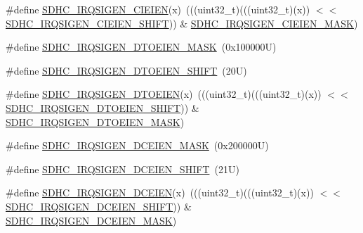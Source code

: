 \begin{DoxyCompactItemize}
\item 
\#define \mbox{\hyperlink{group___s_d_h_c___register___masks_ga99a71a7e4975a9a288ec66d6df527bb8}{S\+D\+H\+C\+\_\+\+I\+R\+Q\+S\+I\+G\+E\+N\+\_\+\+C\+I\+E\+I\+EN}}(x)~(((uint32\+\_\+t)(((uint32\+\_\+t)(x)) $<$$<$ \mbox{\hyperlink{group___s_d_h_c___register___masks_gae0d92453706b49294eac23eb53e2c742}{S\+D\+H\+C\+\_\+\+I\+R\+Q\+S\+I\+G\+E\+N\+\_\+\+C\+I\+E\+I\+E\+N\+\_\+\+S\+H\+I\+FT}})) \& \mbox{\hyperlink{group___s_d_h_c___register___masks_ga3a09f7cd7b41c260dd89ea77a1511005}{S\+D\+H\+C\+\_\+\+I\+R\+Q\+S\+I\+G\+E\+N\+\_\+\+C\+I\+E\+I\+E\+N\+\_\+\+M\+A\+SK}})
\item 
\#define \mbox{\hyperlink{group___s_d_h_c___register___masks_ga16c82f46bb0de77ecd32731d597843e4}{S\+D\+H\+C\+\_\+\+I\+R\+Q\+S\+I\+G\+E\+N\+\_\+\+D\+T\+O\+E\+I\+E\+N\+\_\+\+M\+A\+SK}}~(0x100000\+U)
\item 
\#define \mbox{\hyperlink{group___s_d_h_c___register___masks_ga0d5615f1a4d2d1e8f8897fefbf7c1366}{S\+D\+H\+C\+\_\+\+I\+R\+Q\+S\+I\+G\+E\+N\+\_\+\+D\+T\+O\+E\+I\+E\+N\+\_\+\+S\+H\+I\+FT}}~(20\+U)
\item 
\#define \mbox{\hyperlink{group___s_d_h_c___register___masks_ga8526374ca9d4c7e39425efc7e069a2f9}{S\+D\+H\+C\+\_\+\+I\+R\+Q\+S\+I\+G\+E\+N\+\_\+\+D\+T\+O\+E\+I\+EN}}(x)~(((uint32\+\_\+t)(((uint32\+\_\+t)(x)) $<$$<$ \mbox{\hyperlink{group___s_d_h_c___register___masks_ga0d5615f1a4d2d1e8f8897fefbf7c1366}{S\+D\+H\+C\+\_\+\+I\+R\+Q\+S\+I\+G\+E\+N\+\_\+\+D\+T\+O\+E\+I\+E\+N\+\_\+\+S\+H\+I\+FT}})) \& \mbox{\hyperlink{group___s_d_h_c___register___masks_ga16c82f46bb0de77ecd32731d597843e4}{S\+D\+H\+C\+\_\+\+I\+R\+Q\+S\+I\+G\+E\+N\+\_\+\+D\+T\+O\+E\+I\+E\+N\+\_\+\+M\+A\+SK}})
\item 
\#define \mbox{\hyperlink{group___s_d_h_c___register___masks_ga9993e87c1ebc32e1bf8b58af1460f470}{S\+D\+H\+C\+\_\+\+I\+R\+Q\+S\+I\+G\+E\+N\+\_\+\+D\+C\+E\+I\+E\+N\+\_\+\+M\+A\+SK}}~(0x200000\+U)
\item 
\#define \mbox{\hyperlink{group___s_d_h_c___register___masks_gae8c36f54cd9d4e06778ddea141252fb5}{S\+D\+H\+C\+\_\+\+I\+R\+Q\+S\+I\+G\+E\+N\+\_\+\+D\+C\+E\+I\+E\+N\+\_\+\+S\+H\+I\+FT}}~(21\+U)
\item 
\#define \mbox{\hyperlink{group___s_d_h_c___register___masks_gabac98dddf7f26896f423a49ef0a98109}{S\+D\+H\+C\+\_\+\+I\+R\+Q\+S\+I\+G\+E\+N\+\_\+\+D\+C\+E\+I\+EN}}(x)~(((uint32\+\_\+t)(((uint32\+\_\+t)(x)) $<$$<$ \mbox{\hyperlink{group___s_d_h_c___register___masks_gae8c36f54cd9d4e06778ddea141252fb5}{S\+D\+H\+C\+\_\+\+I\+R\+Q\+S\+I\+G\+E\+N\+\_\+\+D\+C\+E\+I\+E\+N\+\_\+\+S\+H\+I\+FT}})) \& \mbox{\hyperlink{group___s_d_h_c___register___masks_ga9993e87c1ebc32e1bf8b58af1460f470}{S\+D\+H\+C\+\_\+\+I\+R\+Q\+S\+I\+G\+E\+N\+\_\+\+D\+C\+E\+I\+E\+N\+\_\+\+M\+A\+SK}})
$$
\end{DoxyCompactItemize}
